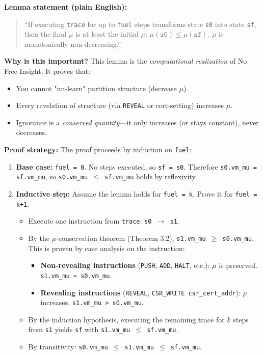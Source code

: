 \textbf{Lemma statement (plain English):}
\begin{quote}
``If executing \texttt{trace} for up to \texttt{fuel} steps transforms state \texttt{s0} into state \texttt{sf}, then the final $\mu$ is at least the initial $\mu$: $\mu(\texttt{s0}) \leq \mu(\texttt{sf})$. $\mu$ is monotonically non-decreasing.''
\end{quote}

\textbf{Why is this important?} This lemma is the \textit{computational realization} of No Free Insight. It proves that:
\begin{itemize}
    \item You cannot "un-learn" partition structure (decrease $\mu$).
    \item Every revelation of structure (via \texttt{REVEAL} or cert-setting) increases $\mu$.
    \item Ignorance is a \textit{conserved quantity}---it only increases (or stays constant), never decreases.
\end{itemize}

\textbf{Proof strategy:} The proof proceeds by induction on \texttt{fuel}:
\begin{enumerate}
    \item \textbf{Base case:} \texttt{fuel = 0}. No steps executed, so \texttt{sf = s0}. Therefore \texttt{s0.vm\_mu = sf.vm\_mu}, so \texttt{s0.vm\_mu $\leq$ sf.vm\_mu} holds by reflexivity.
    
    \item \textbf{Inductive step:} Assume the lemma holds for \texttt{fuel = k}. Prove it for \texttt{fuel = k+1}.
    \begin{itemize}
        \item Execute one instruction from \texttt{trace}: \texttt{s0 $\to$ s1}.
        \item By the $\mu$-conservation theorem (Theorem 3.2), \texttt{s1.vm\_mu $\geq$ s0.vm\_mu}. This is proven by case analysis on the instruction:
        \begin{itemize}
            \item \textbf{Non-revealing instructions} (\texttt{PUSH}, \texttt{ADD}, \texttt{HALT}, etc.): $\mu$ is preserved. \texttt{s1.vm\_mu = s0.vm\_mu}.
            \item \textbf{Revealing instructions} (\texttt{REVEAL}, \texttt{CSR\_WRITE csr\_cert\_addr}): $\mu$ increases. \texttt{s1.vm\_mu > s0.vm\_mu}.
        \end{itemize}
        
        \item By the induction hypothesis, executing the remaining trace for $k$ steps from \texttt{s1} yields \texttt{sf} with \texttt{s1.vm\_mu $\leq$ sf.vm\_mu}.
        
        \item By transitivity: \texttt{s0.vm\_mu $\leq$ s1.vm\_mu $\leq$ sf.vm\_mu}.
    \end{itemize}
\end{enumerate}

